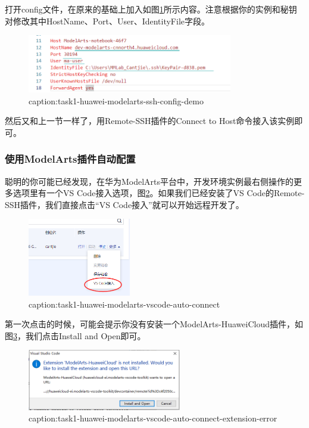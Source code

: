 打开config文件，在原来的基础上加入如图\ref{fig:task1-huawei-modelarts-ssh-config-demo}所示内容。注意根据你的实例和秘钥对修改其中HostName、Port、User、IdentityFile字段。

\begin{figure}[htbp]
	\centering
	\includegraphics[width=0.8\textwidth]{figures/task1-huawei-modelarts-ssh-config-demo.png}
	\caption{caption:task1-huawei-modelarts-ssh-config-demo}
	\label{fig:task1-huawei-modelarts-ssh-config-demo}
\end{figure}

然后又和上一节一样了，用Remote-SSH插件的Connect to Host命令接入该实例即可。

\subsubsection{使用ModelArts插件自动配置}

聪明的你可能已经发现，在华为ModelArts平台中，开发环境实例最右侧操作的更多选项里有一个VS Code接入选项，图\ref{fig:task1-huawei-modelarts-vscode-auto-connect}。如果我们已经安装了VS Code的Remote-SSH插件，我们直接点击“VS Code接入”就可以开始远程开发了。
\begin{figure}[htbp]
	\centering
	\includegraphics[width=0.4\textwidth]{figures/task1-huawei-modelarts-vscode-auto-connect.png}
	\caption{caption:task1-huawei-modelarts-vscode-auto-connect}
	\label{fig:task1-huawei-modelarts-vscode-auto-connect}
\end{figure}

第一次点击的时候，可能会提示你没有安装一个ModelArts-HuaweiCloud插件，如图\ref{fig:task1-huawei-modelarts-vscode-auto-connect-extension-error}，我们点击Install and Open即可。




\begin{figure}[htbp]
	\centering
	\includegraphics[width=0.6\textwidth]{figures/task1-huawei-modelarts-vscode-auto-connect-extension-error.png}
	\caption{caption:task1-huawei-modelarts-vscode-auto-connect-extension-error}
	\label{fig:task1-huawei-modelarts-vscode-auto-connect-extension-error}
\end{figure}

